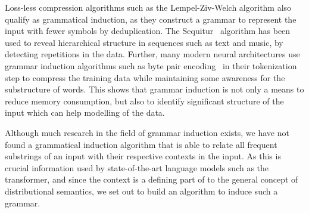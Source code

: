 Loss-less compression algorithms such as the Lempel-Ziv-Welch algorithm also qualify as grammatical induction, as they construct a grammar to represent the input with fewer symbols by deduplication. The Sequitur~\cite{nevill1997identifying} algorithm has been used to reveal hierarchical structure in sequences such as text and music, by detecting repetitions in the data. Further, many modern neural architectures use grammar induction algorithms such as byte pair encoding~\cite{zouhar2023formal} in their tokenization step to compress the training data while maintaining some awareness for the substructure of words. This shows that grammar induction is not only a means to reduce memory consumption, but also to identify significant structure of the input which can help modelling of the data.

Although much research in the field of grammar induction exists, we have not found a grammatical induction algorithm that is able to relate all frequent substrings of an input with their respective contexts in the input. As this is crucial information used by state-of-the-art language models such as the transformer, and since the context is a defining part of to the general concept of distributional semantics, we set out to build an algorithm to induce such a grammar.

